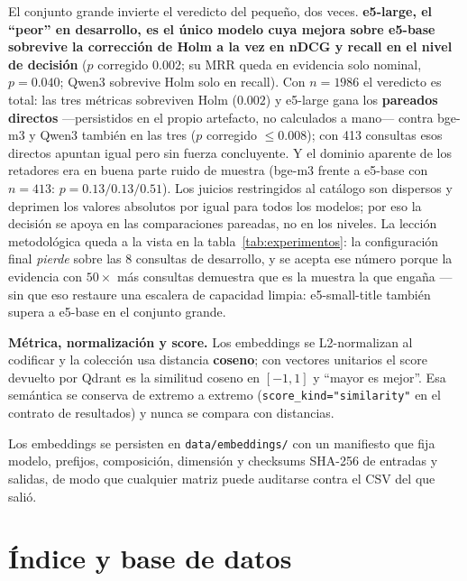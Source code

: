 \documentclass[10pt,twocolumn]{article}
\newcommand{\code}[1]{\texttt{\small #1}}
\begin{document}
El conjunto grande invierte el veredicto del pequeño, dos veces.
\textbf{e5-large, el ``peor'' en desarrollo, es el único modelo cuya mejora
sobre e5-base sobrevive la corrección de Holm a la vez en nDCG y recall en
el nivel de decisión} ($p$ corregido $0.002$; su MRR queda en evidencia
solo nominal, $p{=}0.040$; Qwen3 sobrevive Holm solo en recall). Con $n{=}1986$ el veredicto es total: las tres
métricas sobreviven Holm ($0.002$) y e5-large gana los \textbf{pareados
directos} ---persistidos en el propio artefacto, no calculados a mano---
contra bge-m3 y Qwen3 también en las tres ($p$ corregido $\leq 0.008$); con
413 consultas esos directos apuntan igual pero sin fuerza concluyente. Y el
dominio aparente de los retadores era en buena parte ruido de muestra
(bge-m3 frente a e5-base con $n{=}413$: $p{=}0.13/0.13/0.51$). Los juicios
restringidos al catálogo son dispersos y deprimen los valores absolutos por
igual para todos los modelos; por eso la decisión se apoya en las
comparaciones pareadas, no en los niveles. La lección metodológica queda a
la vista en la tabla~\ref{tab:experimentos}: la configuración final
\emph{pierde} sobre las 8 consultas de desarrollo, y se acepta ese número
porque la evidencia con $50\times$ más consultas demuestra que es la muestra
la que engaña --- sin que eso restaure una escalera de capacidad limpia:
e5-small-title también supera a e5-base en el conjunto grande.

\textbf{Métrica, normalización y score.} Los embeddings se L2-normalizan al
codificar y la colección usa distancia \textbf{coseno}; con vectores
unitarios el score devuelto por Qdrant es la similitud coseno en $[-1,1]$ y
``mayor es mejor''. Esa semántica se conserva de extremo a extremo
(\code{score\_kind="similarity"} en el contrato de resultados) y nunca se
compara con distancias.

Los embeddings se persisten en \code{data/embeddings/} con un manifiesto que
fija modelo, prefijos, composición, dimensión y checksums SHA-256 de entradas
y salidas, de modo que cualquier matriz puede auditarse contra el CSV del que
salió.

\section{Índice y base de datos}
\label{sec:indice}
\end{document}
